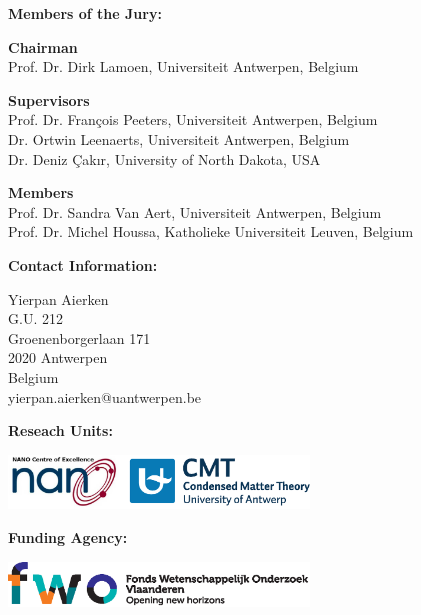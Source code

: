 \clearpage

\thispagestyle{empty}

\begin{list}{}{\leftmargin=0cm}

\item \textbf{Members of the Jury:}

\item \textbf{Chairman} \\
Prof. Dr. Dirk Lamoen, Universiteit Antwerpen, Belgium

\item \textbf{Supervisors} \\
Prof. Dr. Fran\c{c}ois Peeters, Universiteit Antwerpen, Belgium\\
Dr. Ortwin Leenaerts, Universiteit Antwerpen, Belgium\\
Dr. Deniz Çakır, University of North Dakota, USA


\item \textbf{Members} \\
Prof. Dr. Sandra Van Aert, Universiteit Antwerpen, Belgium \\
Prof. Dr. Michel Houssa, Katholieke Universiteit Leuven, Belgium \\
\end{list}

\vspace{0.7cm}

\begin{list}{}{\leftmargin=0cm}
            \item \textbf{Contact Information:}
            \item    Yierpan Aierken \\
            G.U. 212 \\
            Groenenborgerlaan 171 \\
            2020 Antwerpen \\
            Belgium \\
            yierpan.aierken@uantwerpen.be
\end{list}
\vspace{0.7cm}

\begin{list}{}{\leftmargin=0cm}
\item \textbf{Reseach Units:}
\begin{flushleft}
\includegraphics[width =0.6\textwidth]{Figs/research_units.eps}
\end{flushleft}
\end{list}

\vfill
\begin{list}{}{\leftmargin=0cm}
\item \textbf{Funding Agency:}
\begin{flushleft}
\includegraphics[width =0.6\textwidth]{Figs/FWO.eps}
\end{flushleft}
\end{list}